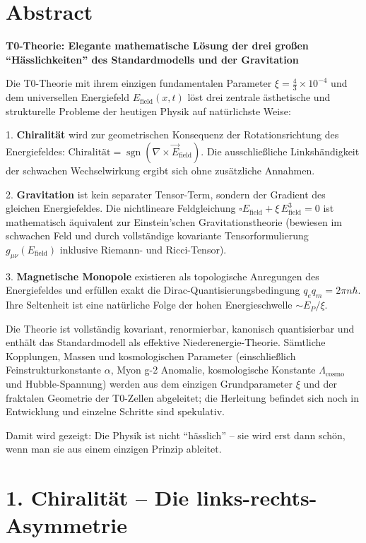 \section*{Abstract}
		\noindent\textbf{T0-Theorie: Elegante mathematische Lösung der drei großen ``Hässlichkeiten'' des Standardmodells und der Gravitation}
		
		Die T0-Theorie mit ihrem einzigen fundamentalen Parameter $\xi = \frac{4}{3} \times 10^{-4}$ und dem universellen Energiefeld $E_{\text{field}}(x,t)$ löst drei zentrale ästhetische und strukturelle Probleme der heutigen Physik auf natürlichste Weise:
		
		1. \textbf{Chiralität} wird zur geometrischen Konsequenz der Rotationsrichtung des Energiefeldes:  
		$\text{Chiralität} = \operatorname{sgn}(\nabla \times \vec{E}_{\text{field}})$.  
		Die ausschließliche Linkshändigkeit der schwachen Wechselwirkung ergibt sich ohne zusätzliche Annahmen.
		
		2. \textbf{Gravitation} ist kein separater Tensor-Term, sondern der Gradient des gleichen Energiefeldes. Die nichtlineare Feldgleichung  
		$\square E_{\text{field}} + \xi \, E_{\text{field}}^3 = 0$  
		ist mathematisch äquivalent zur Einstein'schen Gravitationstheorie (bewiesen im schwachen Feld und durch vollständige kovariante Tensorformulierung $g_{\mu\nu}(E_{\text{field}})$ inklusive Riemann- und Ricci-Tensor).
		
		3. \textbf{Magnetische Monopole} existieren als topologische Anregungen des Energiefeldes und erfüllen exakt die Dirac-Quantisierungsbedingung $q_e q_m = 2\pi n \hbar$. Ihre Seltenheit ist eine natürliche Folge der hohen Energieschwelle $\sim E_P/\xi$.
		
		Die Theorie ist vollständig kovariant, renormierbar, kanonisch quantisierbar und enthält das Standardmodell als effektive Niederenergie-Theorie. Sämtliche Kopplungen, Massen und kosmologischen Parameter (einschließlich Feinstrukturkonstante $\alpha$, Myon g-2 Anomalie, kosmologische Konstante $\Lambda_{\text{cosmo}}$ und Hubble-Spannung) werden aus dem einzigen Grundparameter $\xi$ und der fraktalen Geometrie der T0-Zellen abgeleitet; die Herleitung befindet sich noch in Entwicklung und einzelne Schritte sind spekulativ.
		
		Damit wird gezeigt: Die Physik ist nicht ``hässlich'' – sie wird erst dann schön, wenn man sie aus einem einzigen Prinzip ableitet.


	
	\section*{1. Chiralität – Die links-rechts-Asymmetrie}
	
